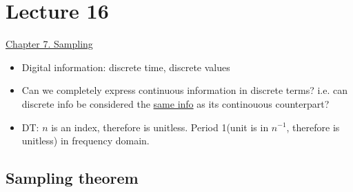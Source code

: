 \documentclass{article}
\begin{document}
\section{Lecture 16}
\underline{Chapter 7. Sampling}
\begin{itemize}
    \item Digital information: discrete time, discrete values
    \item Can we completely express continuous information in discrete terms? i.e. can discrete info be considered the \underline{same info} as its continouous counterpart?
    \item DT: $n$ is an index, therefore is unitless. Period 1(unit is in $n^{-1}$, therefore is unitless) in frequency domain.
\end{itemize}
\subsection{Sampling theorem}
\end{document}

